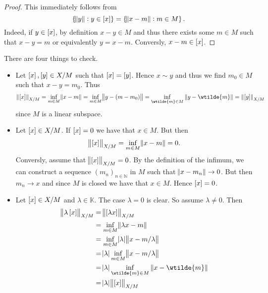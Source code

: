 \begin{enumerate}[label = \textbf{Exercise \arabic*.},wide = 0pt, itemsep = 1.5ex]
\begin{enumerate}[label = \textbf{\alph*.},wide = 0pt, itemsep = 1.5ex]
				\begin{proof}
					This immediately follows from
					\begin{equation*}
						\cbr[0]{ \norm{y} : y \in \sbr{x}} = \cbr[0]{ \norm{x - m} : m \in M}.
					\end{equation*}
					Indeed, if $y \in \sbr{x}$, by definition $x - y \in M$ and thus there exists some $m \in M$ such that $x - y = m$ or equivalently $y = x - m$. Conversly, $x - m \in \sbr{x}$.
				\end{proof}
				There are four things to check. 
				\begin{itemize}[leftmargin = *]
					\item {} Let $\sbr{x},\sbr[0]{y} \in X/M$ such that $\sbr{x} = \sbr[0]{y}$. Hence $x \sim y$ and thus we find $m_0 \in M$ such that $x - y = m_0$. Thus
						\begin{equation*}
							\norm[0]{\sbr{x}}_{X/M} = \inf_{m \in M}\norm{x - m} = \inf_{m \in M} \norm{y - (m - m_0)} = \inf_{\wtilde{m} \in M}\norm[0]{y - \wtilde{m}} = \norm[0]{\sbr[0]{y}}_{X/M}
						\end{equation*}
						\noindent since $M$ is a linear subspace.
					\item {} Let $\sbr{x} \in X/M$. If $\sbr{x} = 0$ we have that $x \in M$. But then 
						\begin{equation*}
							\norm{\sbr{x}}_{X/M} = \inf_{m \in M} \norm{x - m} = 0.
						\end{equation*}
						Conversly, assume that $\norm{\sbr{x}}_{X/M} = 0$. By the definition of the infimum, we can construct a sequence $(m_n)_{n \in \mathbb{N}}$ in $M$ such that $\norm{x - m_n} \to 0$. But then $m_n \to x$ and since $M$ is closed we have that $x \in M$. Hence $\sbr{x} = 0$.
					\item {} Let $\sbr{x} \in X/M$ and $\lambda \in \mathbb{K}$. The case $\lambda = 0$ is clear. So assume $\lambda \neq 0$. Then 
						\begin{align*}
							\norm{\lambda\sbr{x}}_{X/M} &= \norm{\sbr{\lambda x}}_{X/M}\\
							&= \inf_{m \in M} \norm{\lambda x - m}\\
							&= \inf_{m \in M} \abs{\lambda}\norm{x - m/\lambda}\\
							&= \abs{\lambda} \inf_{m \in M} \norm{x - m/\lambda}\\
							&= \abs{\lambda} \inf_{\wtilde{m} \in M} \norm[0]{x - \wtilde{m}}\\
							&= \abs{\lambda} \norm{\sbr{x}}_{X/M}

\end{align*}
\end{itemize}
\end{enumerate}
\end{enumerate}
